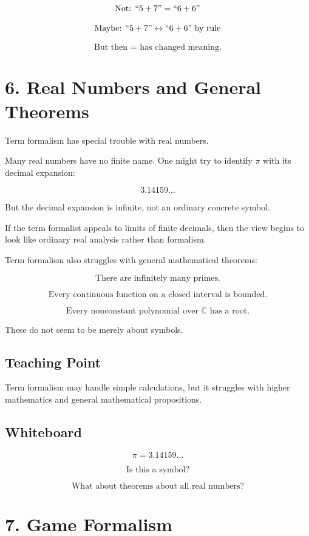 \documentclass[11pt]{article}
\begin{document}
\[
\text{Not: } ``5+7" = ``6+6"
\]

\[
\text{Maybe: } ``5+7" \leftrightarrow ``6+6"
\text{ by rule}
\]

\[
\text{But then } = \text{ has changed meaning.}
\]

\section*{6. Real Numbers and General Theorems}

Term formalism has special trouble with real numbers.

Many real numbers have no finite name. One might try to identify \(\pi\) with its decimal
expansion:

\[
3.14159\ldots
\]

But the decimal expansion is infinite, not an ordinary concrete symbol.

If the term formalist appeals to limits of finite decimals, then the view begins to look like
ordinary real analysis rather than formalism.

Term formalism also struggles with general mathematical theorems:

\[
\text{There are infinitely many primes.}
\]

\[
\text{Every continuous function on a closed interval is bounded.}
\]

\[
\text{Every nonconstant polynomial over } \mathbb{C} \text{ has a root.}
\]

These do not seem to be merely about symbols.

\subsection*{Teaching Point}

Term formalism may handle simple calculations, but it struggles with higher mathematics
and general mathematical propositions.

\subsection*{Whiteboard}

\[
\pi = 3.14159\ldots
\]

\[
\text{Is this a symbol?}
\]

\[
\text{What about theorems about all real numbers?}
\]

\section*{7. Game Formalism}
\end{document}

